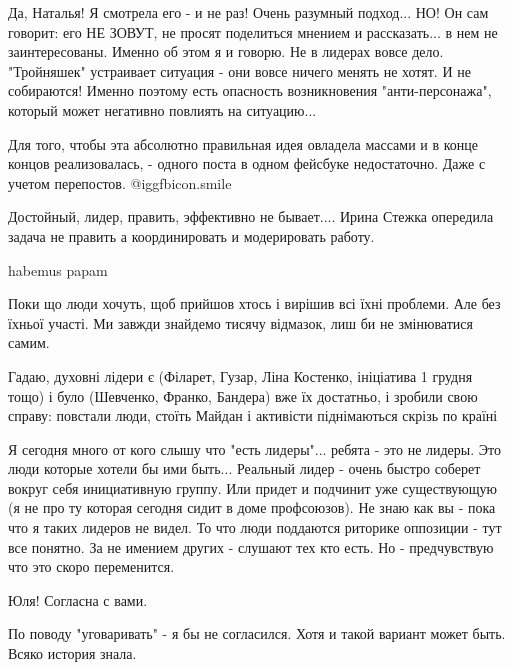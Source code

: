 \begin{itemize}

Да, Наталья! Я смотрела его - и не раз! Очень разумный подход... НО! Он сам
говорит: его НЕ ЗОВУТ, не просят поделиться мнением и рассказать... в нем не
заинтересованы. Именно об этом я и говорю. Не в лидерах вовсе дело. "Тройняшек"
устраивает ситуация - они вовсе ничего менять не хотят. И не собираются! Именно
поэтому есть опасность возникновения "анти-персонажа", который может негативно
повлиять на ситуацию...


Для того, чтобы эта абсолютно правильная идея овладела массами и в конце концов
реализовалась, - одного поста в одном фейсбуке недостаточно. Даже с учетом
перепостов. @igg{fbicon.smile} 


Достойный, лидер, править, эффективно не бывает.... Ирина Стежка опередила
задача не править а координировать и модерировать работу.

habemus papam


Поки що люди хочуть, щоб прийшов хтось і вирішив всі їхні проблеми. Але без
їхньої участі. Ми завжди знайдемо тисячу відмазок, лиш би не змінюватися самим.


Гадаю, духовні лідери є (Філарет, Гузар, Ліна Костенко, ініціатива 1 грудня
тощо) і було (Шевченко, Франко, Бандера) вже їх достатньо, і зробили свою
справу: повстали люди, стоїть Майдан і активісти піднімаються скрізь по країні


Я сегодня много от кого слышу что "есть лидеры"... ребята - это не лидеры. Это
люди которые хотели бы ими быть... Реальный лидер - очень быстро соберет вокруг
себя инициативную группу. Или придет и подчинит уже существующую (я не про ту
которая сегодня сидит в доме профсоюзов). Не знаю как вы - пока что я таких
лидеров не видел. То что люди поддаются риторике оппозиции - тут все понятно.
За не имением других - слушают тех кто есть. Но - предчувствую что это скоро
переменится.

Юля! Согласна с вами.

По поводу "уговаривать" - я бы не согласился. Хотя и такой вариант может быть. Всяко история знала.



\end{itemize}
